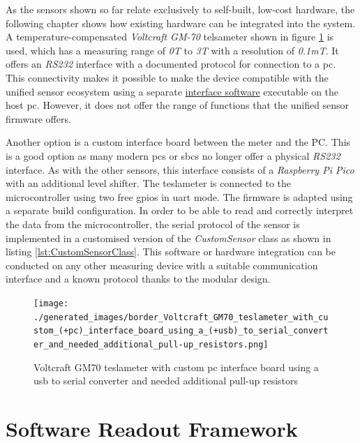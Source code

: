 As the sensors shown so far relate exclusively to self-built, low-cost
hardware, the following chapter shows how existing hardware can be
integrated into the system. A temperature-compensated \emph{Voltcraft
GM-70} telsameter shown in figure
\ref{Voltcraft_GM70_teslameter_with_custom_(+pc)_interface_board_using_a_(+usb)_to_serial_converter_and_needed_additional_pull-up_resistors.png}
is used, which has a measuring range of \emph{0T} to \emph{3T} with a
resolution of \emph{0.1mT}. It offers an \emph{RS232} interface with a
documented protocol for connection to a \gls{pc}. This connectivity
makes it possible to make the device compatible with the unified sensor
ecosystem using a separate
\href{https://github.com/RBEGamer/VoltcraftGM70Rest}{interface software}
executable on the host \gls{pc}. However, it does not offer the range of
functions that the unified sensor firmware offers.

Another option is a custom interface board between the meter and the PC.
This is a good option as many modern \gls{pc}s or \gls{sbc}s no longer
offer a physical \emph{RS232} interface. As with the other sensors, this
interface consists of a \emph{Raspberry Pi Pico} with an additional
level shifter. The teslameter is connected to the microcontroller using
two free \gls{gpio}s in \gls{uart} mode. The firmware is adapted using a
separate build configuration. In order to be able to read and correctly
interpret the data from the microcontroller, the serial protocol of the
sensor is implemented in a customised version of the \emph{CustomSensor}
class as shown in listing \ref{lst:CustomSensorClass}. This software or
hardware integration can be conducted on any other measuring device with
a suitable communication interface and a known protocol thanks to the
modular design.

\begin{figure}
\centering
\texttt{[image: ./generated\_images/border\_Voltcraft\_GM70\_teslameter\_with\_custom\_(+pc)\_interface\_board\_using\_a\_(+usb)\_to\_serial\_converter\_and\_needed\_additional\_pull-up\_resistors.png]}
\caption{Voltcraft GM70 teslameter with custom \gls{pc} interface board
using a \gls{usb} to serial converter and needed additional pull-up
resistors
\label{Voltcraft_GM70_teslameter_with_custom_(+pc)_interface_board_using_a_(+usb)_to_serial_converter_and_needed_additional_pull-up_resistors.png}}
\end{figure}

\hypertarget{software-readout-framework}{%
\chapter{Software Readout Framework}\label{software-readout-framework}}


